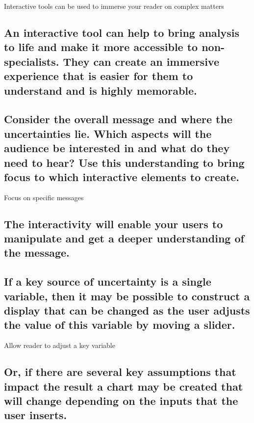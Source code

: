 \documentclass[]{book}
\begin{document}
 Interactive tools can be used to immerse your reader on complex matters

\subsection{An interactive tool can help to bring analysis to life and
make it more accessible to non-specialists. They can create an immersive
experience that is easier for them to understand and is highly
memorable.}\label{an-interactive-tool-can-help-to-bring-analysis-to-life-and-make-it-more-accessible-to-non-specialists.-they-can-create-an-immersive-experience-that-is-easier-for-them-to-understand-and-is-highly-memorable.}

\subsection{Consider the overall message and where the uncertainties
lie. Which aspects will the audience be interested in and what do they
need to hear? Use this understanding to bring focus to which interactive
elements to
create.}\label{consider-the-overall-message-and-where-the-uncertainties-lie.-which-aspects-will-the-audience-be-interested-in-and-what-do-they-need-to-hear-use-this-understanding-to-bring-focus-to-which-interactive-elements-to-create.}

 Focus on specific messages

\subsection{The interactivity will enable your users to manipulate and
get a deeper understanding of the
message.}\label{the-interactivity-will-enable-your-users-to-manipulate-and-get-a-deeper-understanding-of-the-message.}

\subsection{If a key source of uncertainty is a single variable, then it
may be possible to construct a display that can be changed as the user
adjusts the value of this variable by moving a
slider.}\label{if-a-key-source-of-uncertainty-is-a-single-variable-then-it-may-be-possible-to-construct-a-display-that-can-be-changed-as-the-user-adjusts-the-value-of-this-variable-by-moving-a-slider.}

 Allow reader to adjust a key variable

\subsection{Or, if there are several key assumptions that impact the
result a chart may be created that will change depending on the inputs
that the user
inserts.}\label{or-if-there-are-several-key-assumptions-that-impact-the-result-a-chart-may-be-created-that-will-change-depending-on-the-inputs-that-the-user-inserts.}
\end{document}
